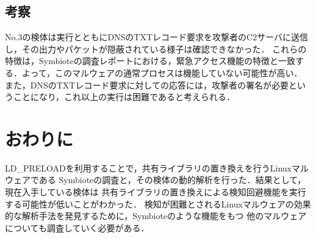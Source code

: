 \documentclass[submit,techreq,noauthor]{eco}	%
\begin{document}
\subsection{考察}
No.3の検体は実行とともにDNSのTXTレコード要求を攻撃者のC2サーバに送信し，その出力やパケットが隠蔽されている様子は確認できなかった．
これらの特徴は，Symbioteの調査レポートにおける，緊急アクセス機能の特徴と一致する．よって，このマルウェアの通常プロセスは機能していない可能性が高い．
  また，DNSのTXTレコード要求に対しての応答には，攻撃者の署名が必要ということになり，これ以上の実行は困難であると考えられる．\\

\section{おわりに}
LD\_PRELOADを利用することで，共有ライブラリの置き換えを行うLinuxマルウェアである
Symbioteの調査と，その検体の動的解析を行った．結果として，現在入手している検体は
共有ライブラリの置き換えによる検知回避機能を実行する可能性が低いことがわかった．
検知が困難とされるLinuxマルウェアの効果的な解析手法を発見するために，Symbioteのような機能をもつ
他のマルウェアについても調査していく必要がある．

\setlength\baselineskip{12pt}
{\small
	
	
}
\end{document}
